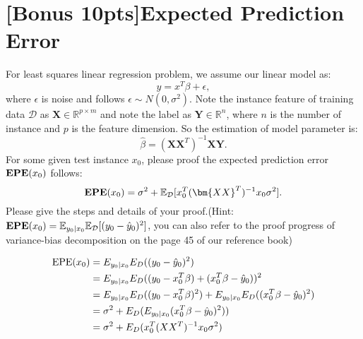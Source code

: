 	\section{[Bonus 10pts]Expected Prediction Error}
	For least squares linear regression problem, we assume our linear model as:\\
	\begin{equation}
	y=x^T \beta+\epsilon,
	\end{equation}
	where $\epsilon$ is noise and follows $\epsilon\sim N(0,\sigma^2)$. Note the instance feature of training data $\mathcal{D}$ as $\bm{X}\in\mathbb{R}^{p\times m}$ and note the label as $\bm{Y}\in\mathbb{R}^n$, where $n$ is the number of instance and $p$ is the feature dimension. So the estimation of model parameter is:\\
	\begin{equation}
	\hat{\beta}=(\bm{XX}^T)^{-1}\bm{XY}.
	\end{equation}
	For some given test instance $x_0$, please proof the expected prediction error $\text{\bf{EPE}}(x_0)$ follows:\\
	\begin{equation}
	\text{\bf{EPE}}(x_0)=\sigma^2+\mathbb{E}_{\mathcal{D}}[x^T_0(\bm{XX}^T)^{-1} x_0\sigma^2].
	\end{equation}
	Please give the steps and details of your proof.(Hint: $\text{\bf{EPE}}(x_0)=\mathbb{E}_{y_0|x_0}\mathbb{E}_{\mathcal{D}}[(y_0-\hat{y}_0)^2]$, you can also refer to the proof progress of variance-bias decomposition on the page 45 of our reference book)

	\begin{solution}
		\begin{align}
		\text{EPE}(x_0) & =E_{y_0|x_0}E_D((y_0-\hat y_0)^2)\notag\\
						& =E_{y_0|x_0}E_D((y_0-x_0^T\beta) + (x_0^T\beta-\hat y_0))^2\notag\\
						& =E_{y_0|x_0}E_D((y_0-x_0^T\beta)^2) + E_{y_0|x_0}E_D((x_0^T\beta-\hat y_0)^2)\notag\\
						& = \sigma^2 + E_D(E_{y_0|x_0}(x_0^T\beta-\hat y_0)^2))\notag\\
						& = \sigma^2 + E_D(x_0^T(XX^T)^{-1}x_0\sigma^2)\notag
		\end{align}
	\end{solution}
	